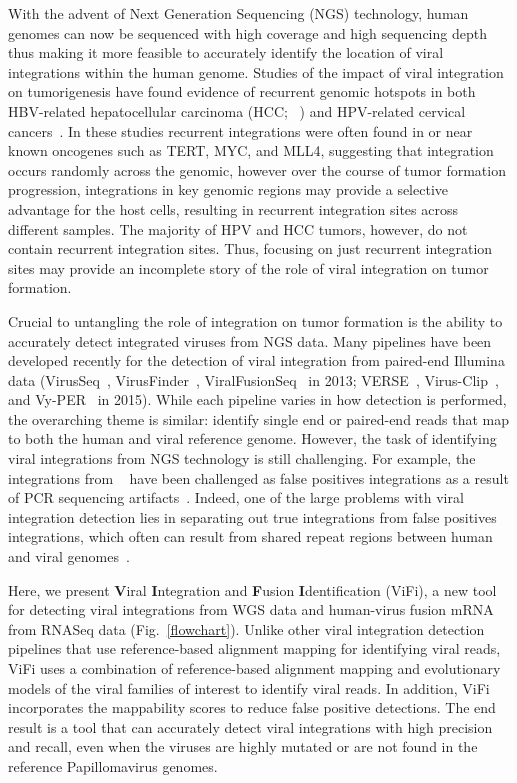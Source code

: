 \documentclass[10pt]{article}
\begin{document}
With the advent of Next Generation Sequencing (NGS) technology, human genomes can now be sequenced with high coverage and high sequencing depth thus making it more feasible to accurately identify the location of viral integrations within the human genome.  Studies of the impact of viral integration on tumorigenesis have found evidence of recurrent genomic hotspots in both HBV-related hepatocellular carcinoma (HCC; ~\cite{Ding2012, Khoury2013}) and HPV-related cervical cancers~\cite{Schmitz2012}.  In these studies recurrent integrations were often found in or near known oncogenes such as TERT, MYC, and MLL4, suggesting that integration occurs randomly across the genomic, however over the course of tumor formation progression, integrations in key genomic regions may provide a selective advantage for the host cells, resulting in recurrent integration sites across different samples.  The majority of HPV and HCC tumors, however, do not contain recurrent integration sites.  Thus, focusing on just recurrent integration sites may provide an incomplete story of the role of viral integration on tumor formation.  

Crucial to untangling the role of integration on tumor formation is the ability to accurately detect integrated viruses from NGS data.  Many pipelines have been developed recently for the detection of viral integration from paired-end Illumina data (VirusSeq~\cite{Chen2013}, VirusFinder~\cite{Wang2013}, ViralFusionSeq~\cite{Li2013} in 2013; VERSE~\cite{Wang2015}, Virus-Clip~\cite{Ho2015}, and Vy-PER~\cite{Forster2015} in 2015).  While each pipeline varies in how detection is performed, the overarching theme is similar: identify single end or paired-end reads that map to both the human and viral reference genome.  However, the task of identifying viral integrations from NGS technology is still challenging.  For example, the integrations from ~\cite{Hu2015} have been challenged as false positives integrations as a result of PCR sequencing artifacts~\cite{Dyer2015}.  Indeed, one of the large problems with viral integration detection lies in separating out true integrations from false positives integrations, which often can result from shared repeat regions between human and viral genomes~\cite{Forster2015}.  

Here, we present \textbf{V}iral \textbf{I}ntegration and \textbf{F}usion \textbf{I}dentification (ViFi), a new tool for detecting viral integrations from WGS data and human-virus fusion mRNA from RNASeq data (Fig.~\ref{flowchart}).  Unlike other viral integration detection pipelines that use reference-based alignment mapping for identifying viral reads, ViFi uses a combination of reference-based alignment mapping and evolutionary models of the viral families of interest to identify viral reads.  In addition, ViFi incorporates the mappability scores to reduce false positive detections.  The end result is a tool that can accurately detect viral integrations with high precision and recall, even when the viruses are highly mutated or are not found in the reference Papillomavirus genomes.  
\end{document}
